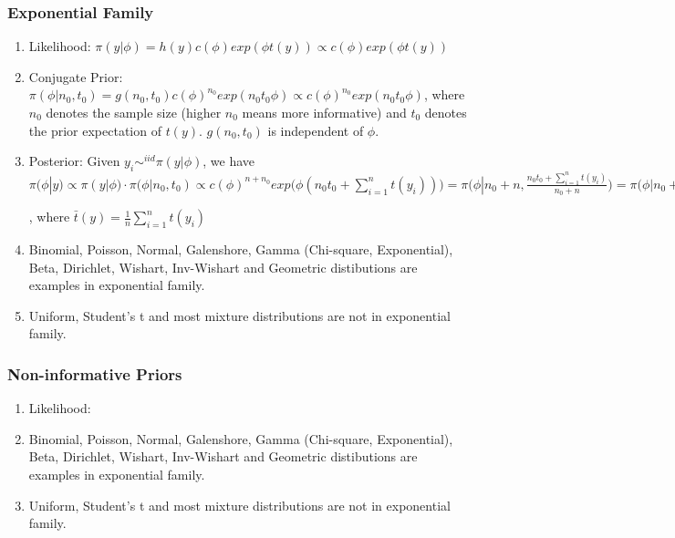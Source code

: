 \documentclass{beamer}
\begin{document}


\begin{frame}
\frametitle{Exponential Family}

\begin{enumerate}
\item Likelihood: $\pi(y|\phi) = h(y) c(\phi)exp(\phi t(y)) \propto c(\phi) exp(\phi t(y))$

\item Conjugate Prior: $\pi(\phi|n_0,t_0) = g(n_0,t_0) c(\phi)^{n_0} exp(n_0t_0\phi) \propto c(\phi)^{n_0} exp(n_0t_0\phi)$, where $n_0$ denotes the sample size (higher $n_0$ means more informative) and $t_0$ denotes the prior expectation of $t(y)$. $g(n_0,t_0)$ is independent of $\phi$.
\item Posterior: Given $y_i \sim^{iid} \pi(y|\phi)$, we have $\pi(\phi|y) \propto \pi(y|\phi) \cdot \pi(\phi|n_0,t_0) \propto c(\phi)^{n+n_0} exp\Big(\phi (n_0t_0 + \sum_{i=1}^n t(y_i))\Big) = \pi\Big(\phi| n_0 + n, \frac{n_0t_0+ \sum_{i=1}^n t(y_i)}{n_0+n}\Big) = \pi\Big(\phi| n_0 + n, \frac{n_0t_0+ n \bar t(y)}{n_0+n}\Big)$

, where $\bar t(y) = \frac{1}{n}\sum_{i=1}^n t(y_i) $

\item Binomial, Poisson, Normal, Galenshore, Gamma (Chi-square, Exponential), Beta, Dirichlet, Wishart, Inv-Wishart and Geometric distibutions are examples in exponential family.
\item Uniform, Student's t and most mixture distributions are not in exponential family. 

\end{enumerate}

\end{frame}


\begin{frame}
\frametitle{Non-informative Priors}

\begin{enumerate}
\item Likelihood: 



\item Binomial, Poisson, Normal, Galenshore, Gamma (Chi-square, Exponential), Beta, Dirichlet, Wishart, Inv-Wishart and Geometric distibutions are examples in exponential family.
\item Uniform, Student's t and most mixture distributions are not in exponential family. 

\end{enumerate}

\end{frame}
\end{document}
